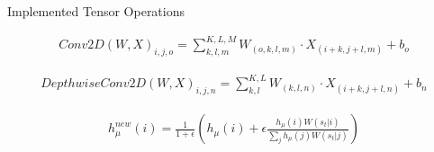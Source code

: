 \documentclass[final]{beamer}
\newlength{\onecolwid}
\newlength{\twocolwid}
\begin{document}
\begin{frame}[t]
\begin{columns}[t]
\begin{column}{\twocolwid}
\begin{columns}[t,totalwidth=\twocolwid]
\end{columns} %


\begin{alertblock}{Implemented Tensor Operations}
	
\begin{eqnarray} \label{eq:conv2D}
Conv2D\left(W,X\right)_{i,j,o}=\sum_{k,l,m}^{K,L,M}W_{(o,k,l,m)} \cdot X_{(i+k,j+l,m)}+b_{o}
\end{eqnarray}


\begin{eqnarray} \label{eq:dconv2D}
DepthwiseConv2D\left(W,X\right)_{i,j,n}=\sum_{k,l}^{K,L}W_{(k,l,n)} \cdot X_{(i+k,j+l,n)}+b_{n}
\end{eqnarray}

\begin{eqnarray} \label{eq:sbs_update}
h_\mu^{new}(i) = \frac{1}{1+\epsilon} \left(h_\mu(i) + \epsilon \frac{h_\mu(i) W(s_t|i) }{\sum_j h_\mu(j) W(s_t|j)} \right) 
\end{eqnarray}

\end{alertblock} 


\begin{columns}[t,totalwidth=\twocolwid] %

\begin{column}{\onecolwid} %




\end{column} %

\begin{column}{\onecolwid} %

\end{column} %

\end{columns} %

\end{column} %


\end{columns}
\end{frame}
\end{document}
